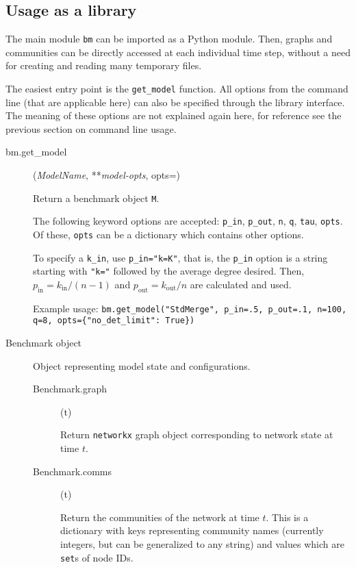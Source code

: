 \documentclass{article}
\def\pin{p_\mathrm{in}}
\def\pout{p_\mathrm{out}}
\def\kin{k_\mathrm{in}}
\def\kout{k_\mathrm{out}}
\def\code#1{\texttt{#1}}
\begin{document}
\subsection{Usage as a library}
\label{sec:use-library}


The main module \texttt{bm} can be imported as a Python module.  Then,
graphs and communities can be directly accessed at each individual
time step, without a need for creating and reading many temporary
files.

The easiest entry point is the \texttt{get\_model} function.  All
options from the command line (that are applicable here) can also be
specified through the library interface.  The meaning of these options
are not explained again here, for reference see the previous section
on command line usage.

\begin{description}
\item[bm.get\_model]\hspace{-.15cm}(\textsl{ModelName}, **\textsl{model-opts}, opts={})

  Return a benchmark object \code{M}.

  The following keyword options are accepted: \code{p\_in}, \code{p\_out},
  \code{n}, \code{q}, \code{tau}, \code{opts}.  Of these, \code{opts}
  can be a dictionary which contains other options.

  To specify a \code{k\_in}, use \code{p\_in="k=K"}, that is, the
  \code{p\_in} option is a string starting with \code{"k="} followed
  by the average degree desired.  Then, $\pin=\kin/(n-1)$ and
  $\pout=\kout/n$ are calculated and used.

  Example usage: \code{bm.get\_model("StdMerge", p\_in=.5, p\_out=.1,
    n=100, q=8, opts=\{"no\_det\_limit": True\})}

\item[Benchmark object] Object representing model state and
  configurations.

  \begin{description}
  \item [Benchmark.graph]\hspace{-.15cm}(t)

    Return \code{networkx} graph object corresponding to network state
    at time $t$.

  \item [Benchmark.comms]\hspace{-.15cm}(t)

    Return the communities of the network at time $t$.  This is a
    dictionary with keys representing community names (currently integers, but
    can be generalized to any string) and values which are
    \texttt{set}s of node IDs.
  \end{description}



\end{description}
\end{document}
